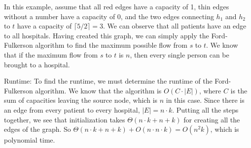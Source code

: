 \documentclass{article} %
\begin{document}

    In this example, assume that all red edges have a capacity of 1, thin edges without a number have a capacity of 0, and the two edges connecting $h_1$ and $h_2$ to $t$ have a capacity of $\lceil 5/2 \rceil = 3$. We can observe that all patients have an edge to all hospitals. Having created this graph, we can simply apply the Ford-Fulkerson algorithm to find the maximum possible flow from $s$ to $t$. We know that if the maximum flow from $s$ to $t$ is $n$, then every single person can be brought to a hospital. 

    \vspace{5pt}

    Runtime: To find the runtime, we must determine the runtime of the Ford-Fulkerson algorithm. We know that the algorithm is $O(C \cdot |E|)$, where $C$ is the sum of capacities leaving the source node, which is $n$ in this case. Since there is an edge from every patient to every hospital, $|E| = n \cdot k$. Putting all the steps together, we see that initialization takes $\Theta(n \cdot k + n + k)$ for creating all the edges of the graph. So $\Theta(n \cdot k + n + k) + O(n \cdot n \cdot k) = O(n^2k)$, which is polynomial time.
\end{document}
